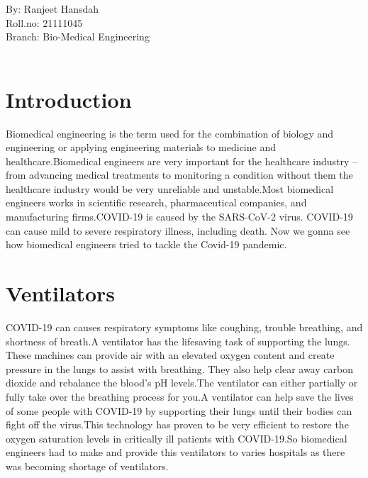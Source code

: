 \documentclass{article}[A4,12pt]
\begin{document}

\large By: Ranjeet Hansdah\\

\large Roll.no: 21111045\\

\large Branch: Bio-Medical Engineering\\~\\

\newpage

\section*{Introduction}
Biomedical engineering is the term used for the combination of biology and engineering or applying engineering materials to medicine and healthcare.Biomedical engineers are very important for the healthcare industry – from advancing medical treatments to monitoring a condition without them the healthcare industry would be very unreliable and unstable.Most biomedical engineers works in scientific research, pharmaceutical companies, and manufacturing firms.COVID-19 is caused by the SARS-CoV-2 virus. COVID-19 can cause mild to severe respiratory illness, including death. Now we gonna see how biomedical engineers tried to tackle the Covid-19 pandemic.

\section{Ventilators}
COVID-19 can causes respiratory symptoms like coughing, trouble breathing, and shortness of breath.A ventilator has the lifesaving task of supporting the lungs. These machines can provide air with an elevated oxygen content and create pressure in the lungs to assist with breathing. They also help clear away carbon dioxide and rebalance the blood’s pH levels.The ventilator can either partially or fully take over the breathing process for you.A ventilator can help save the lives of some people with COVID-19 by supporting their lungs until their bodies can fight off the virus.This technology has proven to be very efficient to restore the oxygen saturation levels in critically ill patients with COVID-19.So biomedical engineers had to make and provide this ventilators to varies hospitals as there was becoming shortage of ventilators.
\end{document}
